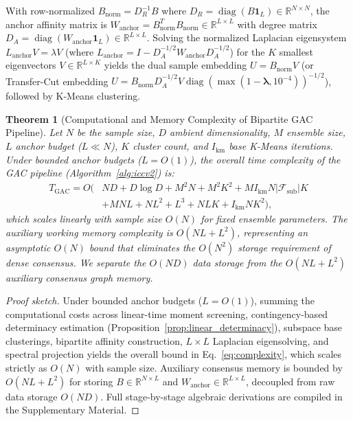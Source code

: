 \documentclass[pdflatex,sn-mathphys-num]{sn-jnl}
\theoremstyle{thmstyleone}
\newtheorem{theorem}{Theorem}
\theoremstyle{thmstyletwo}
\theoremstyle{thmstylethree}
\begin{document}
With row-normalized $B_{\text{norm}} = D_R^{-1} B$ where $D_R = \operatorname{diag}(B \mathbf{1}_L) \in \mathbb{R}^{N \times N}$, the anchor affinity matrix is $W_{\text{anchor}} = B_{\text{norm}}^T B_{\text{norm}} \in \mathbb{R}^{L \times L}$ with degree matrix $D_A = \operatorname{diag}(W_{\text{anchor}} \mathbf{1}_L) \in \mathbb{R}^{L \times L}$. Solving the normalized Laplacian eigensystem $L_{\text{anchor}} V = \lambda V$ (where $L_{\text{anchor}} = I - D_A^{-1/2} W_{\text{anchor}} D_A^{-1/2}$) for the $K$ smallest eigenvectors $V \in \mathbb{R}^{L \times K}$ yields the dual sample embedding $U = B_{\text{norm}} V$ (or Transfer-Cut embedding $U = B_{\text{norm}} D_A^{-1/2} V \operatorname{diag}(\max(1-\boldsymbol{\lambda}, 10^{-4}))^{-1/2}$), followed by K-Means clustering.

\begin{theorem}[Computational and Memory Complexity of Bipartite GAC Pipeline]\label{thm:complexity}
Let $N$ be the sample size, $D$ ambient dimensionality, $M$ ensemble size, $L$ anchor budget ($L \ll N$), $K$ cluster count, and $I_{\text{km}}$ base K-Means iterations. Under bounded anchor budgets ($L = O(1)$), the overall time complexity of the GAC pipeline (Algorithm~\ref{alg:iccv2}) is:
\begin{equation}\label{eq:complexity}
\begin{split}
 T_{\text{GAC}} = O\bigl(&N D + D \log D + M^2 N + M^2 K^2 + M I_{\text{km}} N |\mathcal{F}_{\text{sub}}| K \\
  &+ M N L + N L^2 + L^3 + N L K + I_{\text{km}} N K^2\bigr),
\end{split}
\end{equation}
which scales linearly with sample size $O(N)$ for fixed ensemble parameters. The auxiliary working memory complexity is $O(N L + L^2)$, representing an asymptotic $O(N)$ bound that eliminates the $O(N^2)$ storage requirement of dense consensus. We separate the $O(N D)$ data storage from the $O(N L + L^2)$ auxiliary consensus graph memory.
\end{theorem}

\begin{proof}[Proof sketch]
Under bounded anchor budgets ($L = O(1)$), summing the computational costs across linear-time moment screening, contingency-based determinacy estimation (Proposition~\ref{prop:linear_determinacy}), subspace base clusterings, bipartite affinity construction, $L \times L$ Laplacian eigensolving, and spectral projection yields the overall bound in Eq.~\eqref{eq:complexity}, which scales strictly as $O(N)$ with sample size. Auxiliary consensus memory is bounded by $O(NL + L^2)$ for storing $B \in \mathbb{R}^{N \times L}$ and $W_{\text{anchor}} \in \mathbb{R}^{L \times L}$, decoupled from raw data storage $O(ND)$. Full stage-by-stage algebraic derivations are compiled in the Supplementary Material.
\end{proof}
\end{document}
